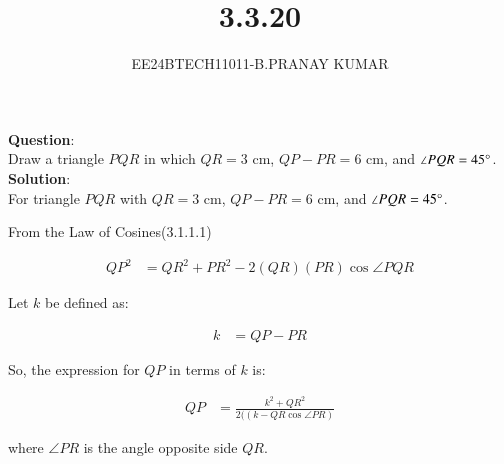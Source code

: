 \documentclass[journal]{IEEEtran}
\begin{document}

\vspace{3cm}

\title{3.3.20}
\author{EE24BTECH11011-B.PRANAY KUMAR
}
 \maketitle
{\let\newpage\relax\maketitle}

\renewcommand{\thefigure}{\theenumi}
\renewcommand{\thetable}{\theenumi}
\setlength{\intextsep}{10pt} %


\renewcommand{\thetable}{\theenumi}



\textbf{Question}:\\
Draw a triangle $PQR$ in which $QR = 3$ cm, $QP - PR = 6$ cm, and $\angle PQR = 45\degree$.\\

\textbf{Solution}:\\
For triangle $PQR$ with $QR = 3$ cm, $QP - PR = 6$ cm, and $\angle PQR = 45\degree$.

From the Law of Cosines(3.1.1.1)

\begin{align}
	QP^2 &= QR^2 + PR^2 - 2 (QR) ( PR )  \cos\angle PQR 
\end{align}

Let $k$ be defined as:

\begin{align}
    k &= QP - PR
\end{align}

So, the expression for $QP$ in terms of $k$ is:

\begin{align}
	QP &= \frac{k^2 + QR^2}{2 ( \left(k - QR  \cos\angle PR\right)}
\end{align}

where $\angle PR$ is the angle opposite side $QR$.\\
\end{document}

